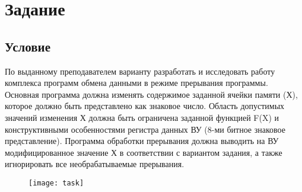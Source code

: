 
\tableofcontents

\newpage

\section{Задание}
\subsection{Условие}
По выданному преподавателем варианту разработать и исследовать работу комплекса программ обмена данными в режиме прерывания программы. Основная программа должна изменять содержимое заданной ячейки памяти (Х), которое должно быть представлено как знаковое число. Область допустимых значений изменения Х должна быть ограничена заданной функцией F(X) и конструктивными особенностями регистра данных ВУ (8-ми битное знаковое представление). Программа обработки прерывания должна выводить на ВУ модифицированное значение Х в соответствии с вариантом задания, а также игнорировать все необрабатываемые прерывания.

\begin{figure}[H]
\centering
\texttt{[image: task]}
\label{pic:task}
\end{figure}



\newpage
